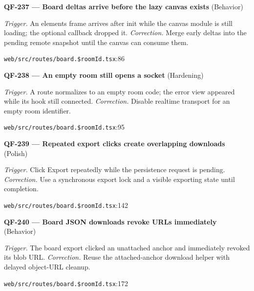 \begin{minipage}{\linewidth}
\textbf{QF-237 --- Board deltas arrive before the lazy canvas exists} {\scriptsize\color{accent}(Behavior)}\par
\textit{Trigger.} An elements frame arrives after init while the canvas module is still loading; the optional callback dropped it. \textit{Correction.} Merge early deltas into the pending remote snapshot until the canvas can consume them.\par
{\scriptsize\color{muted}\nolinkurl{web/src/routes/board.$roomId.tsx}:86}\par
\end{minipage}\par\vspace{7pt}
\begin{minipage}{\linewidth}
\textbf{QF-238 --- An empty room still opens a socket} {\scriptsize\color{accent}(Hardening)}\par
\textit{Trigger.} A route normalizes to an empty room code; the error view appeared while its hook still connected. \textit{Correction.} Disable realtime transport for an empty room identifier.\par
{\scriptsize\color{muted}\nolinkurl{web/src/routes/board.$roomId.tsx}:95}\par
\end{minipage}\par\vspace{7pt}
\begin{minipage}{\linewidth}
\textbf{QF-239 --- Repeated export clicks create overlapping downloads} {\scriptsize\color{accent}(Polish)}\par
\textit{Trigger.} Click Export repeatedly while the persistence request is pending. \textit{Correction.} Use a synchronous export lock and a visible exporting state until completion.\par
{\scriptsize\color{muted}\nolinkurl{web/src/routes/board.$roomId.tsx}:142}\par
\end{minipage}\par\vspace{7pt}
\begin{minipage}{\linewidth}
\textbf{QF-240 --- Board JSON downloads revoke URLs immediately} {\scriptsize\color{accent}(Behavior)}\par
\textit{Trigger.} The board export clicked an unattached anchor and immediately revoked its blob URL. \textit{Correction.} Reuse the attached-anchor download helper with delayed object-URL cleanup.\par
{\scriptsize\color{muted}\nolinkurl{web/src/routes/board.$roomId.tsx}:172}\par
\end{minipage}\par\vspace{7pt}
